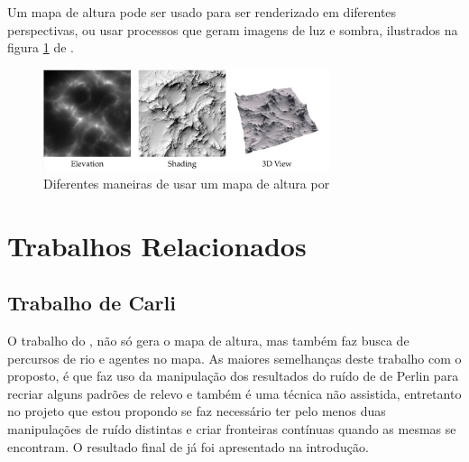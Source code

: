 Um mapa de altura pode ser usado para ser renderizado em diferentes perspectivas,
ou usar processos que geram imagens de luz e sombra, ilustrados na figura \ref{fig:hmap} de \cite{dachsbacher2006interactive}.
\begin{figure}[H]
    \centering
    \includegraphics[width=0.75\textwidth]{figuras/hmap.png}
    \caption{Diferentes maneiras de usar um mapa de altura por }
    \label{fig:hmap}
\end{figure}


\section{Trabalhos Relacionados}

\subsection{Trabalho de Carli}
O trabalho do \cite{carli2012canion}, não só gera o mapa de altura, mas também
faz busca de percursos de rio e agentes no mapa. As maiores semelhanças deste 
trabalho com o proposto, é que faz uso da manipulação dos resultados do ruído de
de Perlin para recriar alguns padrões de relevo e também é uma técnica não assistida,
entretanto no projeto que 
estou propondo se faz necessário ter pelo menos duas manipulações de ruído distintas
e criar fronteiras contínuas quando as mesmas se encontram. O resultado final de
\cite{carli2012canion} já foi apresentado na introdução.
